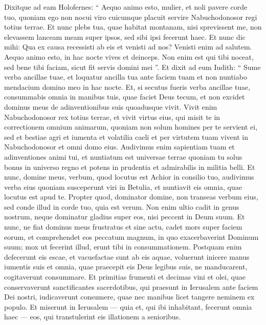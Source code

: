 \begin{biblechapter}
\begin{biblechapter}
\begin{biblechapter}
\begin{biblechapter}
\begin{biblechapter}
\begin{biblechapter}
\begin{biblechapter}
\begin{biblechapter}
\begin{biblechapter}
\begin{biblechapter}
\begin{biblechapter}
\verse Dixitque ad eam Holofernes: “ Aequo animo esto, mulier, et noli pavere corde tuo, quoniam ego non nocui viro cuicumque placuit servire Nabuchodonosor regi totius terrae. 
\verse Et nunc plebs tua, quae habitat montanam, nisi sprevissent me, non elevassem lanceam meam super ipsos, sed sibi ipsi fecerunt haec. 
\verse Et nunc dic mihi: Qua ex causa recessisti ab eis et venisti ad nos? Venisti enim ad salutem. Aequo animo esto, in hac nocte vives et deinceps. 
\verse Non enim est qui tibi noceat, sed bene tibi faciam, sicut fit servis domini mei ”.
 \verse Et dixit ad eum Iudith: “ Sume verba ancillae tuae, et loquatur ancilla tua ante faciem tuam et non nuntiabo mendacium domino meo in hac nocte. 
\verse Et, si secutus fueris verba ancillae tuae, consummabis omnia in manibus tuis, quae faciet Deus tecum, et non excidet dominus meus de adinventionibus suis quoadusque vivit. 
\verse Vivit enim Nabuchodonosor rex totius terrae, et vivit virtus eius, qui misit te in correctionem omnium animarum, quoniam non solum homines per te servient ei, sed et bestiae agri et iumenta et volatilia caeli et per virtutem tuam vivent in Nabuchodonosor et omni domo eius.
 \verse Audivimus enim sapientiam tuam et adinventiones animi tui, et nuntiatum est universae terrae quoniam tu solus bonus in universo regno et potens in prudentia et admirabilis in militia belli. 
\verse Et nunc, domine meus, verbum, quod locutus est Achior in consilio tuo, audivimus verba eius quoniam susceperunt viri in Betulia, et nuntiavit eis omnia, quae locutus est apud te. 
\verse Propter quod, dominator domine, non transeas verbum eius, sed conde illud in corde tuo, quia est verum. Non enim ultio cadit in genus nostrum, neque dominatur gladius super eos, nisi peccent in Deum suum. 
\verse Et nunc, ne fiat dominus meus frustratus et sine actu, cadet mors super faciem eorum, et comprehendet eos peccatum magnum, in quo exacerbaverint Dominum suum; mox ut fecerint illud, erunt tibi in consummationem. 
\verse Postquam enim defecerunt eis escae, et vacuefactae sunt ab eis aquae, voluerunt inicere manus iumentis suis et omnia, quae praecepit eis Deus legibus suis, ne manducarent, cogitaverunt consummare. 
\verse Et primitias frumenti et decimas vini et olei, quae conservaverunt sanctificantes sacerdotibus, qui praesunt in Ierusalem ante faciem Dei nostri, iudicaverunt consumere, quae nec manibus licet tangere neminem ex populo. 
\verse Et miserunt in Ierusalem — quia et, qui ibi inhabitant, fecerunt omnia haec — eos, qui transtulerint eis illationem a senioribus. 

\end{biblechapter}
\end{biblechapter}
\end{biblechapter}
\end{biblechapter}
\end{biblechapter}
\end{biblechapter}
\end{biblechapter}
\end{biblechapter}
\end{biblechapter}
\end{biblechapter}
\end{biblechapter}
